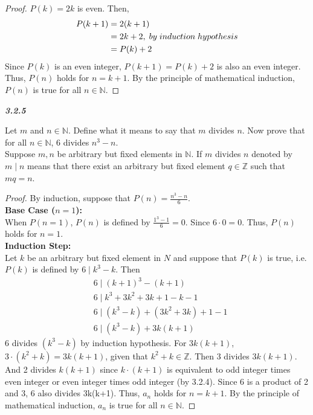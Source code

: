 \documentclass{article}
\begin{document}
\begin{flushleft}
\begin{enumerate}
\begin{flushleft}
\begin{proof}
				$P(k)= 2k$ is even. Then,
				\begin{align*}
					P(k+1) & = 2(k+1) \\
					& = 2k + 2, \thickspace by \thickspace induction \thickspace hypothesis \\
					& = P(k)+2
				\end{align*}
				Since $P(k)$ is an even integer, $P(k+1) = P(k)+2$ is also an even integer. Thus, $P(n)$ holds for $n=k+1$. 
				By the principle of mathematical induction, $P(n)$ is true for all $n \in \mathbb{N}$.
			\end{proof}
		\end{flushleft}
		
		\textbf{\textit{3.2.5}}
		\begin{flushleft}
			Let $m$ and $n \in \mathbb{N}$. Define what it means to say that $m$ divides $n$. Now prove that for all $n \in \mathbb{N}$, 6 divides $n^3-n$.
			\\
			Suppose $m, n$ be arbitrary but fixed elements in $\mathbb{N}$. If $m$ divides $n$ denoted by $m\mid n$ means that there exist an arbitrary but fixed element $q \in \mathbb{Z}$ such that $mq = n$. 
			\begin{proof}
				By induction, 
				suppose that $P(n) = \frac{n^3-n}{6}$. \\
				\textbf{Base Case ($n = 1$):}
				\\ When $P(n=1)$, $P(n)$ is defined by $\frac{1^3-1}{6} = 0$. Since $6 \cdot 0 = 0$. Thus, $P(n)$ holds for $n=1$.
				\\
				\textbf{Induction Step:}
				\\
				Let $k$ be an arbitrary but fixed element in $N$ and suppose that $P(k)$ is true, i.e. $P(k)$ is defined by $6 \mid k^3-k$. Then
				\begin{align*}
				& 6 \mid (k+1)^3-(k+1) \\
				& 6 \mid k^3+3k^2+3k+1-k-1 \\
				& 6 \mid (k^3-k)+(3k^2+3k)+1-1 \\
				& 6 \mid (k^3-k)+3k(k+1) 
				\end{align*}
				6 divides $(k^3-k)$ by induction hypothesis. For $3k(k+1)$, $3 \cdot (k^2+k) = 3k(k+1)$, given that $k^2+k \in \mathbb{Z}$. Then 3 divides $3k(k+1)$. And 2 divides $k(k+1)$ since $k \cdot (k+1)$ is equivalent to odd integer times even integer or even integer times odd integer (by 3.2.4). Since 6 is a product of 2 and 3, 6 also divides 3k(k+1). Thus, $a_n$ holds for $n=k+1$. By the principle of mathematical induction, $a_n$ is true for all $n \in \mathbb{N}$.
			\end{proof}
		\end{flushleft}
		\end{enumerate}
	\end{flushleft}
\end{document}
